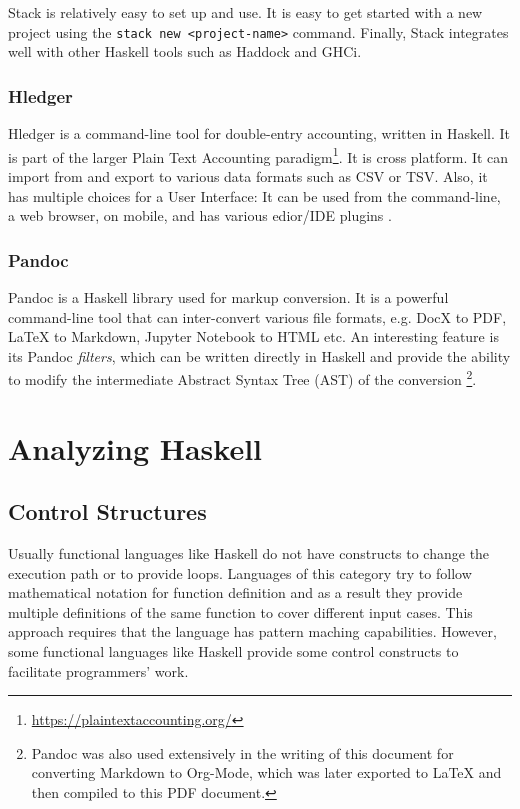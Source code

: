 \documentclass[a4paper, titlepage, twoside]{article}
\begin{document}
Stack is relatively easy to set up and use. It is easy to get started with a new project using the \texttt{stack new <project-name>} command. Finally, Stack integrates well with other Haskell tools such as Haddock and GHCi.

\subsubsection{Hledger}
\label{sec:org5a0b9ff}

Hledger is a command-line tool for double-entry accounting, written in Haskell. It is part of the larger Plain Text Accounting paradigm\footnote{\url{https://plaintextaccounting.org/}}. It is cross platform. It can import from and export to various data formats such as CSV or TSV. Also, it has multiple choices for a User Interface: It can be used from the command-line, a web browser, on mobile, and has various edior/IDE plugins \autocite{michaelHledger2023}.

\subsubsection{Pandoc}
\label{sec:org2d59b4f}

Pandoc is a Haskell library used for markup conversion. It is a powerful command-line tool that can inter-convert various file formats, e.g. DocX to PDF, \LaTeX{} to Markdown, Jupyter Notebook to HTML etc. An interesting feature is its Pandoc \emph{filters}, which can be written directly in Haskell and provide the ability to modify the intermediate Abstract Syntax Tree (AST) of the conversion \autocite{macfarlanePandoc2023}\footnote{Pandoc was also used extensively in the writing of this document for converting Markdown to Org-Mode, which was later exported to \LaTeX{} and then compiled to this PDF document.}.

\section{Analyzing Haskell}
\label{sec:org10236f8}

\subsection{Control Structures}
\label{sec:org846886d}

Usually functional languages like Haskell do not have constructs to change the execution path or to provide loops. Languages of this category try to follow mathematical notation for function definition and as a result they provide multiple definitions of the same function to cover different input cases. This approach requires that the language has pattern maching capabilities. However, some functional languages like Haskell provide some control constructs to facilitate programmers' work.
\end{document}
